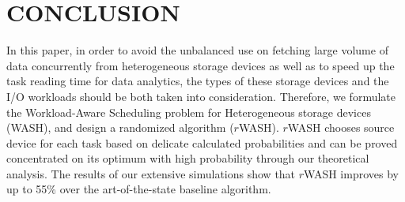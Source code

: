 \documentclass[conference]{IEEEtran}
\begin{document}
\section{CONCLUSION}\label{CONCLUSION}
In this paper, in order to avoid the unbalanced use on fetching large volume of data concurrently from heterogeneous storage devices as well as to speed up the task reading time for data analytics, the types of these storage devices and the I/O workloads should be both taken into consideration. Therefore, we formulate the Workload-Aware Scheduling problem for Heterogeneous storage devices (WASH), and design a randomized algorithm ($r$WASH). $r$WASH chooses source device for each task based on delicate calculated probabilities and can be proved concentrated on its optimum with high probability through our theoretical analysis. The results of our extensive simulations show that $r$WASH improves by up to 55\% over the art-of-the-state baseline algorithm.
\end{document}
